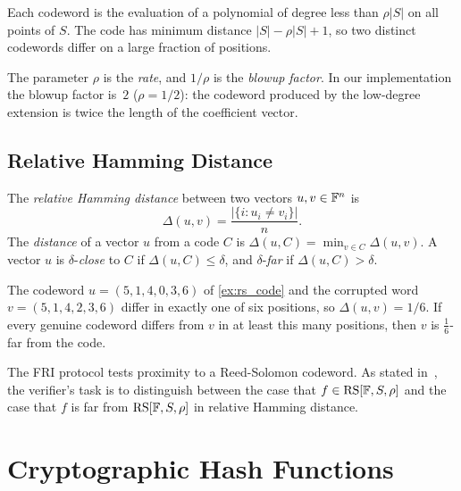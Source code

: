 Each codeword is the evaluation of a polynomial of degree less than
$\rho|S|$ on all points of $S$. The code has minimum distance
$|S| - \rho|S| + 1$, so two distinct codewords differ on a large
fraction of positions.

The parameter $\rho$ is the \emph{rate}, and $1/\rho$ is the
\emph{blowup factor}. In our implementation the blowup factor is~$2$
($\rho = 1/2$): the codeword produced by the low-degree extension is
twice the length of the coefficient vector.


\subsection{Relative Hamming Distance}
\label{subsec:hamming}

\begin{definition}
\label{def:hamming}
The \emph{relative Hamming distance} between two vectors
$u, v \in \mathbb{F}^n$ is
%
\[
\Delta(u, v) = \frac{|\{i : u_i \neq v_i\}|}{n}.
\]
%
The \emph{distance} of a vector $u$ from a code $C$ is
$\Delta(u, C) = \min_{v \in C} \Delta(u, v)$. A vector $u$ is
$\delta$-\emph{close} to $C$ if $\Delta(u, C) \leq \delta$, and
$\delta$-\emph{far} if $\Delta(u, C) > \delta$.
\end{definition}

\begin{example}
\label{ex:hamming}
The codeword $u = (5,1,4,0,3,6)$ of \cref{ex:rs_code} and the corrupted
word $v = (5,1,4,2,3,6)$ differ in exactly one of six positions, so
$\Delta(u, v) = 1/6$. If every genuine codeword differs from $v$ in at
least this many positions, then $v$ is $\tfrac16$-far from the code.
\end{example}

The FRI protocol tests proximity to a Reed-Solomon codeword. As stated
in~\cite[Section~2.1]{BBHR18}, the verifier's task is to distinguish
between the case that $f \in \mathrm{RS}[\mathbb{F}, S, \rho]$ and the case that $f$
is far from $\mathrm{RS}[\mathbb{F}, S, \rho]$ in relative Hamming distance.


\section{Cryptographic Hash Functions}
\label{sec:hash_functions}


